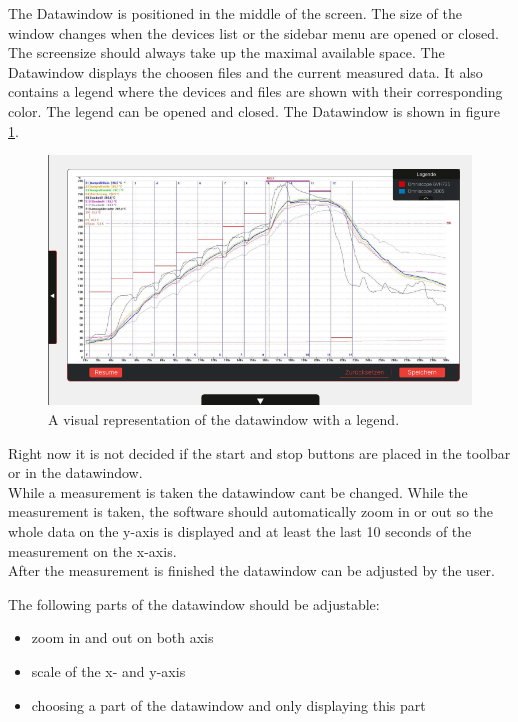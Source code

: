 \documentclass{scrreprt}
\begin{document}
The Datawindow is positioned in the middle of the screen. The size of the window changes when the devices list or the sidebar menu are opened or closed. The screensize should always take up the maximal available space. 
The Datawindow displays the choosen files and the current measured data. It also contains a legend where the devices and files are shown with their corresponding color. The legend can be opened and closed. 
The Datawindow is shown in figure \ref{fig: datawindow}.\\
\begin{figure}
    \includegraphics[width=.9\textwidth]{assets/pictures/DatawindowVersion1.0.png}
    \caption[]{A visual representation of the datawindow with a legend.}
    \label{fig: datawindow}
\end{figure}

Right now it is not decided if the start and stop buttons are placed in the toolbar or in the datawindow. \\

While a measurement is taken the datawindow cant be changed. While the measurement is taken, the software should automatically zoom in or out so the whole data on the y-axis is displayed and at least the last 10 seconds of the measurement on the x-axis. \\

After the measurement is finished the datawindow can be adjusted by the user. 

The following parts of the datawindow should be adjustable: 

\begin{itemize}
    \item zoom in and out on both axis
    \item scale of the x- and y-axis 
    \item choosing a part of the datawindow and only displaying this part 
\end{itemize}
\end{document}
